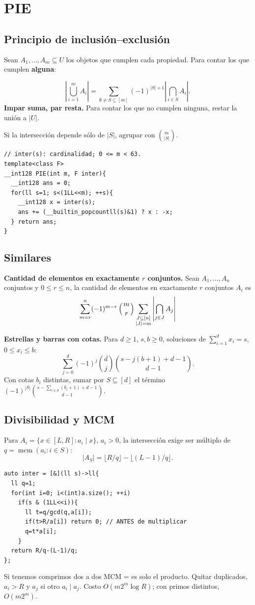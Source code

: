 \section{PIE}
\subsection{Principio de inclusión--exclusión}
Sean $A_1,\dots,A_m\subseteq U$ los objetos que cumplen cada propiedad. Para contar los que cumplen \textbf{alguna}:

\[
\left|\bigcup_{i=1}^m A_i\right|=
\sum_{\emptyset\ne S\subseteq[m]}(-1)^{|S|+1}
\left|\bigcap_{i\in S}A_i\right|.
\]
\textbf{Impar suma, par resta.} Para contar los que no cumplen ninguna, restar la unión a $|U|$.  


Si la intersección depende sólo de $|S|$, agrupar con $\binom m{|S|}$. 

\begin{verbatim}
// inter(s): cardinalidad; 0 <= m < 63.
template<class F>
__int128 PIE(int m, F inter){
  __int128 ans = 0;
  for(ll s=1; s<(1LL<<m); ++s){
    __int128 x = inter(s);
    ans += (__builtin_popcountll(s)&1) ? x : -x;
  } return ans;
}
\end{verbatim}

\subsection{Similares}

\textbf{Cantidad de elementos en exactamente $r$ conjuntos.} Sean $A_1, \dots, A_n$ conjuntos y $0 \leq r \leq n$, la cantidad de elementos en exactamente $r$ conjuntos $A_i$ es
$$\sum_{m = r}^n (-1)^{m - r}\binom{m}{r}\sum_{\substack{J \subseteq [n]\\|J| = m}} \abs{\bigcap_{j \in J} A_j}$$

\textbf{Estrellas y barras con cotas.} Para $d\ge1$, $s,b\ge0$, soluciones de $\sum_{i=1}^d x_i=s$, $0\le x_i\le b$:
\[
\sum_{j=0}^d(-1)^j\binom dj
\binom{s-j(b+1)+d-1}{d-1}.
\]
Con cotas $b_i$ distintas, sumar por $S\subseteq[d]$ el término $(-1)^{|S|}\binom{s-\sum_{i\in S}(b_i+1)+d-1}{d-1}$. 


\subsection{Divisibilidad y MCM}
Para $A_i=\{x\in[L,R]:a_i\mid x\}$, $a_i>0$, la intersección exige ser múltiplo de $q=\operatorname{mcm}(a_i:i\in S)$:
\[
|A_S|=\lfloor R/q\rfloor-\lfloor(L-1)/q\rfloor.
\]
\begin{verbatim}
auto inter = [&](ll s)->ll{
  ll q=1;
  for(int i=0; i<(int)a.size(); ++i)
    if(s & (1LL<<i)){
      ll t=q/gcd(q,a[i]);
      if(t>R/a[i]) return 0; // ANTES de multiplicar
      q=t*a[i];
    }
  return R/q-(L-1)/q;
};
\end{verbatim}
Si tenemos comprimos dos a dos MCM = es solo el producto. Quitar duplicados, $a_i>R$ y $a_j$ si otro $a_i\mid a_j$. Costo $O(m2^m\log R)$; con primos distintos, $O(m2^m)$.

